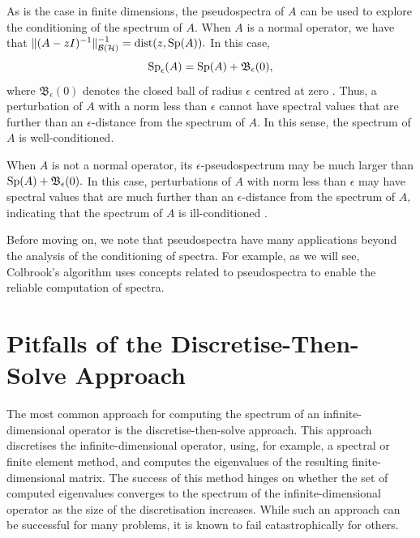 As is the case in finite dimensions, the pseudospectra of $A$ can be used to explore the conditioning of the spectrum of $A.$ When $A$ is a normal operator, we have that $ \|(A-zI)^{-1} \|_{\mathcal{B}(\mathcal{H})}^{-1} = \operatorname{dist}(z, \operatorname{Sp}\!\left(A\right)).$ In this case,
\begin{equation}
    \operatorname{Sp}_{\epsilon}\!\left(A\right) = \operatorname{Sp}\!\left(A\right) + \mathfrak{B}_{\epsilon}(0),
\end{equation}
where $\mathfrak{B}_{\epsilon}(0)$ denotes the closed ball of radius $\epsilon$ centred at zero \cite[Section~1.1.4]{Matt}. Thus,  a perturbation of $A$ with a norm less than $\epsilon$ cannot have spectral values that are further than an $\epsilon$-distance from the spectrum of $A.$ In this sense, the spectrum of $A$ is well-conditioned. 

When $A$ is not a normal operator, its $\epsilon$-pseudospectrum may be much larger than $\operatorname{Sp}\!\left(A\right) + \mathfrak{B}_{\epsilon}(0).$ In this case, perturbations of $A$ with norm less than $\epsilon$  may have spectral values that are much further than an $\epsilon$-distance from the spectrum of $A,$ indicating that the spectrum of $A$ is ill-conditioned \cite[Section~1.1.4]{Matt}.

Before moving on, we note that pseudospectra have many applications beyond the analysis of the conditioning of spectra. For example, as we will see, Colbrook's algorithm uses concepts related to pseudospectra to enable the reliable computation of spectra.






\section{Pitfalls of the Discretise-Then-Solve Approach}\label{pit}

The most common approach for computing the spectrum of an infinite-dimensional operator is the discretise-then-solve approach. This approach discretises the infinite-dimensional operator, using, for example, a spectral or finite element method, and computes the eigenvalues of the resulting finite-dimensional matrix. The success of this method hinges on whether the set of computed eigenvalues converges to the spectrum of the infinite-dimensional operator as the size of the discretisation increases. While such an approach can be successful for many problems, it is known to fail catastrophically for others.

